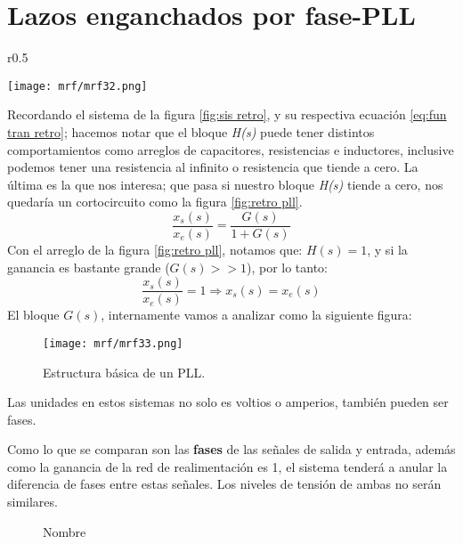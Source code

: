 \documentclass[
	12pt, %
	fleqn, %
	a4paper, %
	oneside, %
]{LegrandOrangeBook}
\begin{document}
\section{Lazos enganchados por fase-PLL}
\begin{wrapfigure}{r}{0.5\linewidth}
  \begin{center}
    \texttt{[image: mrf/mrf32.png]}
  \end{center}
  \caption{Retroalimentación por corto circuito.}
  \label{fig:retro pll}
\end{wrapfigure}
Recordando el sistema de la figura \ref{fig:sis retro}, y su respectiva ecuación \ref{eq:fun tran retro}; hacemos notar que el bloque \textit{H(s)} puede tener distintos comportamientos como arreglos de capacitores, resistencias e inductores, inclusive podemos tener una resistencia al infinito o resistencia que tiende a cero. La última es la que nos interesa; que pasa si nuestro bloque \textit{H(s)} tiende a cero, nos quedaría un cortocircuito como la figura \ref{fig:retro pll}.\\
\begin{equation}
\frac{x_s(s)}{x_e(s)}=\frac{G(s)}{1+G(s)}
\label{eq:function transferencia pll}
\end{equation}
Con el arreglo de la figura \ref{fig:retro pll}, notamos que: $H(s)=1$, y si la ganancia es bastante grande ($G(s)>>1$), por lo tanto:
\begin{displaymath}
\frac{x_s(s)}{x_e(s)}=1\Rightarrow x_s(s)=x_e(s)
\end{displaymath}
El bloque $G(s)$, internamente vamos a analizar como la siguiente figura:
\begin{figure}[H]
\centering
\texttt{[image: mrf/mrf33.png]}
\caption{Estructura básica de un PLL.}
\end{figure}
\begin{notation}
Las unidades en estos sistemas no solo es voltios o amperios, también pueden ser fases.
\end{notation}
\begin{remark}
Como lo que se comparan son las \textbf{fases} de las señales de salida y entrada, además como la ganancia de la red de realimentación es 1, el sistema tenderá a anular la diferencia de fases entre estas señales. Los niveles de tensión de ambas no serán similares.
\end{remark}
\begin{figure}[H]
\centering
{}
\caption{Nombre}
\end{figure}
\end{document}
